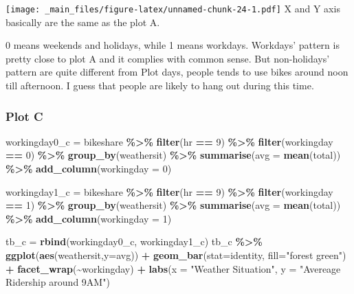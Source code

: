 \documentclass[
]{article}
\newenvironment{Shaded}{\begin{snugshade}}{\end{snugshade}}
\newcommand{\AttributeTok}[1]{\textcolor[rgb]{0.13,0.29,0.53}{#1}}
\newcommand{\DecValTok}[1]{\textcolor[rgb]{0.00,0.00,0.81}{#1}}
\newcommand{\FunctionTok}[1]{\textcolor[rgb]{0.13,0.29,0.53}{\textbf{#1}}}
\newcommand{\NormalTok}[1]{#1}
\newcommand{\OtherTok}[1]{\textcolor[rgb]{0.56,0.35,0.01}{#1}}
\newcommand{\SpecialCharTok}[1]{\textcolor[rgb]{0.81,0.36,0.00}{\textbf{#1}}}
\newcommand{\StringTok}[1]{\textcolor[rgb]{0.31,0.60,0.02}{#1}}
\begin{document}
\texttt{[image: \_main\_files/figure-latex/unnamed-chunk-24-1.pdf]}
X and Y axis basically are the same as the plot A.

0 means weekends and holidays, while 1 means workdays. Workdays' pattern is pretty close to plot A and it complies with common sense. But non-holidays' pattern are quite different from Plot days, people tends to use bikes around noon till afternoon. I guess that people are likely to hang out during this time.

\hypertarget{plot-c}{%
\subsubsection{Plot C}\label{plot-c}}

\begin{Shaded}
\begin{Highlighting}[]
\NormalTok{workingday0\_c }\OtherTok{=}\NormalTok{ bikeshare }\SpecialCharTok{\%\textgreater{}\%} 
                \FunctionTok{filter}\NormalTok{(hr }\SpecialCharTok{==} \DecValTok{9}\NormalTok{) }\SpecialCharTok{\%\textgreater{}\%} 
                \FunctionTok{filter}\NormalTok{(workingday }\SpecialCharTok{==} \DecValTok{0}\NormalTok{) }\SpecialCharTok{\%\textgreater{}\%} 
                \FunctionTok{group\_by}\NormalTok{(weathersit) }\SpecialCharTok{\%\textgreater{}\%} 
                \FunctionTok{summarise}\NormalTok{(}\AttributeTok{avg =} \FunctionTok{mean}\NormalTok{(total)) }\SpecialCharTok{\%\textgreater{}\%} 
                \FunctionTok{add\_column}\NormalTok{(}\AttributeTok{workingday =} \DecValTok{0}\NormalTok{)}

\NormalTok{workingday1\_c }\OtherTok{=}\NormalTok{ bikeshare }\SpecialCharTok{\%\textgreater{}\%} 
                \FunctionTok{filter}\NormalTok{(hr }\SpecialCharTok{==} \DecValTok{9}\NormalTok{) }\SpecialCharTok{\%\textgreater{}\%} 
                \FunctionTok{filter}\NormalTok{(workingday }\SpecialCharTok{==} \DecValTok{1}\NormalTok{) }\SpecialCharTok{\%\textgreater{}\%} 
                \FunctionTok{group\_by}\NormalTok{(weathersit) }\SpecialCharTok{\%\textgreater{}\%} 
                \FunctionTok{summarise}\NormalTok{(}\AttributeTok{avg =} \FunctionTok{mean}\NormalTok{(total)) }\SpecialCharTok{\%\textgreater{}\%} 
                \FunctionTok{add\_column}\NormalTok{(}\AttributeTok{workingday =} \DecValTok{1}\NormalTok{)}

\NormalTok{tb\_c }\OtherTok{=} \FunctionTok{rbind}\NormalTok{(workingday0\_c, workingday1\_c)}
\NormalTok{tb\_c }\SpecialCharTok{\%\textgreater{}\%} \FunctionTok{ggplot}\NormalTok{(}\FunctionTok{aes}\NormalTok{(weathersit,}\AttributeTok{y=}\NormalTok{avg)) }\SpecialCharTok{+} \FunctionTok{geom\_bar}\NormalTok{(}\AttributeTok{stat=}\StringTok{\textquotesingle{}identity\textquotesingle{}}\NormalTok{, }\AttributeTok{fill=}\StringTok{"forest green"}\NormalTok{) }\SpecialCharTok{+} \FunctionTok{facet\_wrap}\NormalTok{(}\SpecialCharTok{\textasciitilde{}}\NormalTok{workingday) }\SpecialCharTok{+} \FunctionTok{labs}\NormalTok{(}\AttributeTok{x =} \StringTok{"Weather Situation"}\NormalTok{, }\AttributeTok{y =} \StringTok{"Avereage Ridership around 9AM"}\NormalTok{)}
\end{Highlighting}
\end{Shaded}
\end{document}
